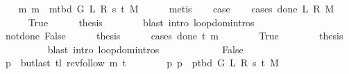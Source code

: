 \begin{isabellebody}
\ \ \isamarkupfalse%
\ m{\isacharcolon}{\kern0pt}\ {\isachardoublequoteopen}{\isacharquery}{\kern0pt}m\ {\isacharequal}{\kern0pt}\ m{\isacharunderscore}{\kern0pt}tbd\ G\ L\ R\ s\ t\ M{\isachardoublequoteclose}\isanewline
\ \ \ \ \isamarkupfalse%
\ metis\isanewline
\ \ \isamarkupfalse%
\ {\isacharquery}{\kern0pt}case\isanewline
\ \ \isamarkupfalse%
\ {\isacharparenleft}{\kern0pt}cases\ {\isachardoublequoteopen}done{\isacharunderscore}{\kern0pt}{}\ L\ R\ M{\isachardoublequoteclose}{\isacharparenright}{\kern0pt}\isanewline
\ \ \ \ \isamarkupfalse%
\ True\isanewline
\ \ \ \ \isamarkupfalse%
\ {\isacharquery}{\kern0pt}thesis\isanewline
\ \ \ \ \ \ \isamarkupfalse%
\ {\isacharparenleft}{\kern0pt}blast\ intro{\isacharcolon}{\kern0pt}\ loop{\isacharprime}{\kern0pt}{\isachardot}{\kern0pt}domintros{\isacharparenright}{\kern0pt}\isanewline
\ \ \isamarkupfalse%
\isanewline
\ \ \ \ \isamarkupfalse%
\ not{\isacharunderscore}{\kern0pt}done{\isacharunderscore}{\kern0pt}{}{\isacharcolon}{\kern0pt}\ False\isanewline
\ \ \ \ \isamarkupfalse%
\ {\isacharquery}{\kern0pt}thesis\isanewline
\ \ \ \ \isamarkupfalse%
\ {\isacharparenleft}{\kern0pt}cases\ {\isachardoublequoteopen}done{\isacharunderscore}{\kern0pt}{}\ t\ {\isacharquery}{\kern0pt}m{\isachardoublequoteclose}{\isacharparenright}{\kern0pt}\isanewline
\ \ \ \ \ \ \isamarkupfalse%
\ True\isanewline
\ \ \ \ \ \ \isamarkupfalse%
\ {\isacharquery}{\kern0pt}thesis\isanewline
\ \ \ \ \ \ \ \ \isamarkupfalse%
\ {\isacharparenleft}{\kern0pt}blast\ intro{\isacharcolon}{\kern0pt}\ loop{\isacharprime}{\kern0pt}{\isachardot}{\kern0pt}domintros{\isacharparenright}{\kern0pt}\isanewline
\ \ \ \ \isamarkupfalse%
\isanewline
\ \ \ \ \ \ \isamarkupfalse%
\ False\isanewline
\ \ \ \ \ \ \isamarkupfalse%
\ {\isacharquery}{\kern0pt}p\ {\isacharequal}{\kern0pt}\ {\isachardoublequoteopen}butlast\ {\isacharparenleft}{\kern0pt}tl\ {\isacharparenleft}{\kern0pt}rev{\isacharunderscore}{\kern0pt}follow\ {\isacharquery}{\kern0pt}m\ t{\isacharparenright}{\kern0pt}{\isacharparenright}{\kern0pt}{\isachardoublequoteclose}\isanewline
\ \ \ \ \ \ \isamarkupfalse%
\ p{\isacharcolon}{\kern0pt}\ {\isachardoublequoteopen}{\isacharquery}{\kern0pt}p\ {\isacharequal}{\kern0pt}\ p{\isacharunderscore}{\kern0pt}tbd\ G\ L\ R\ s\ t\ M{\isachardoublequoteclose}\isanewline

\end{isabellebody}
